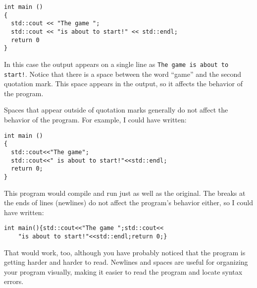 \begin{lstlisting}[frame=single]
int main ()
{
  std::cout << "The game ";
  std::cout << "is about to start!" << std::endl;
  return 0
}
\end{lstlisting}

In this case the output appears on a single line as
{\tt The game is about to start!}.  Notice that there is a space
between the word ``game'' and the second quotation mark.
This space appears in the output, so it affects the behavior
of the program.

Spaces that appear outside of quotation marks generally do
not affect the behavior of the program.  For example, I
could have written:

\begin{lstlisting}[frame=single]
int main ()
{
  std::cout<<"The game";
  std::cout<<" is about to start!"<<std::endl;
  return 0;
}
\end{lstlisting}

This program would compile and run just as well as the original.
The breaks at the ends of lines (newlines) do not affect
the program's behavior either, so I could have written:

\begin{lstlisting}[frame=single]
int main(){std::cout<<"The game ";std::cout<<
    "is about to start!"<<std::endl;return 0;}
\end{lstlisting}

That would work, too, although you have probably noticed that
the program is getting harder and harder to read.  Newlines and
spaces are useful for organizing your program visually, making
it easier to read the program and locate syntax errors.

